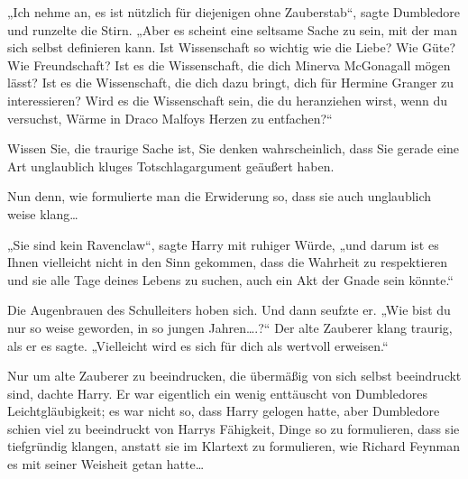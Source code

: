 „Ich nehme an, es ist nützlich für diejenigen ohne Zauberstab“, sagte Dumbledore und runzelte die Stirn. „Aber es scheint eine seltsame Sache zu sein, mit der man sich selbst definieren kann. Ist Wissenschaft so wichtig wie die Liebe? Wie Güte? Wie Freundschaft? Ist es die Wissenschaft, die dich Minerva McGonagall mögen lässt? Ist es die Wissenschaft, die dich dazu bringt, dich für Hermine Granger zu interessieren? Wird es die Wissenschaft sein, die du heranziehen wirst, wenn du versuchst, Wärme in Draco Malfoys Herzen zu entfachen?“

Wissen Sie, die traurige Sache ist, Sie denken wahrscheinlich, dass Sie gerade eine Art unglaublich kluges Totschlagargument geäußert haben.

Nun denn, wie formulierte man die Erwiderung so, dass sie auch unglaublich weise klang…

„Sie sind kein Ravenclaw“, sagte Harry mit ruhiger Würde, „und darum ist es Ihnen vielleicht nicht in den Sinn gekommen, dass die Wahrheit zu respektieren und sie alle Tage deines Lebens zu suchen, auch ein Akt der Gnade sein könnte.“

Die Augenbrauen des Schulleiters hoben sich. Und dann seufzte er. „Wie bist du nur so weise geworden, in so jungen Jahren….?“ Der alte Zauberer klang traurig, als er es sagte. „Vielleicht wird es sich für dich als wertvoll erweisen.“

Nur um alte Zauberer zu beeindrucken, die übermäßig von sich selbst beeindruckt sind, dachte Harry. Er war eigentlich ein wenig enttäuscht von Dumbledores Leichtgläubigkeit; es war nicht so, dass Harry gelogen hatte, aber Dumbledore schien viel zu beeindruckt von Harrys Fähigkeit, Dinge so zu formulieren, dass sie tiefgründig klangen, anstatt sie im Klartext zu formulieren, wie Richard Feynman es mit seiner Weisheit getan hatte…

